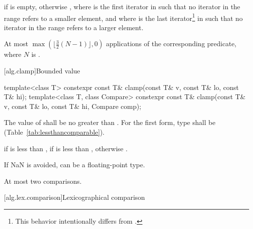 \begin{itemdescr}
\pnum
\returns
{} if  is empty, otherwise
, where  is
the first iterator in  such that no iterator in the range refers
to a smaller element, and where  is the last iterator\footnote{This behavior
intentionally differs from .}
in  such that no iterator in the range refers to a larger element.

\pnum
\complexity
At most
$\max(\bigl\lfloor{\frac{3}{2}} (N-1)\bigr\rfloor, 0)$
applications of the corresponding predicate, where $N$ is .
\end{itemdescr}

[alg.clamp]{Bounded value}

%
\begin{itemdecl}
template<class T>
  constexpr const T& clamp(const T& v, const T& lo, const T& hi);
template<class T, class Compare>
  constexpr const T& clamp(const T& v, const T& lo, const T& hi, Compare comp);
\end{itemdecl}

\begin{itemdescr}
\pnum
\requires
The value of  shall be no greater than .
For the first form, type 
shall be  (Table~\ref{tab:lessthancomparable}).

\pnum
\returns
{} if  is less than ,
 if  is less than ,
otherwise .

\pnum
\begin{note}
If NaN is avoided,  can be a floating-point type.
\end{note}

\pnum
\complexity
At most two comparisons.
\end{itemdescr}

[alg.lex.comparison]{Lexicographical comparison}

